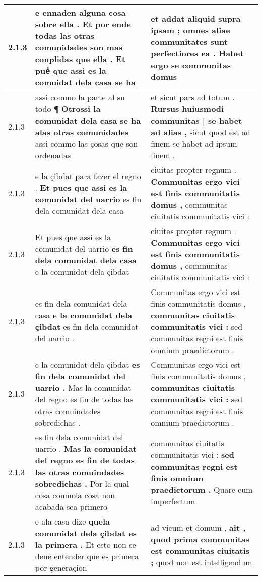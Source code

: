 \begin{tabular}{|p{1cm}|p{6.5cm}|p{6.5cm}|}
2.1.3 & e ennaden alguna cosa sobre ella . \textbf{ Et por ende todas las otras comunidades son mas conplidas que ella . } Et pueᷤ que assi es la comuidat dela casa se ha & et addat aliquid supra ipsam ; \textbf{ omnes aliae communitates sunt perfectiores ea . } Habet ergo se communitas domus \\\hline
2.1.3 & assi commo la parte al su todo ¶ \textbf{ Otrossi la comunidat dela casa se ha alas otras comunidades } assi commo las çosas que son ordenadas & et sicut pars ad totum . \textbf{ Rursus huiusmodi communitas | se habet ad alias , } sicut quod est ad finem se habet ad ipsum finem . \\\hline
2.1.3 & e la çibdat para fazer el regno . \textbf{ Et pues que assi es la comunidat del uarrio } es fin dela comunidat dela casa & ciuitas propter regnum . \textbf{ Communitas ergo vici est finis communitatis domus , } communitas ciuitatis communitatis vici : \\\hline
2.1.3 & Et pues que assi es la comunidat del uarrio \textbf{ es fin dela comunidat dela casa } e la comunidat dela çibdat & ciuitas propter regnum . \textbf{ Communitas ergo vici est finis communitatis domus , } communitas ciuitatis communitatis vici : \\\hline
2.1.3 & es fin dela comunidat dela casa \textbf{ e la comunidat dela çibdat } es fin dela comunidat del uarrio . & Communitas ergo vici est finis communitatis domus , \textbf{ communitas ciuitatis communitatis vici : } sed communitas regni est finis omnium praedictorum . \\\hline
2.1.3 & e la comunidat dela çibdat \textbf{ es fin dela comunidat del uarrio . } Mas la comunidat del regno es fin de todas las otras comuindades sobredichas . & Communitas ergo vici est finis communitatis domus , \textbf{ communitas ciuitatis communitatis vici : } sed communitas regni est finis omnium praedictorum . \\\hline
2.1.3 & es fin dela comunidat del uarrio . \textbf{ Mas la comunidat del regno es fin de todas las otras comuindades sobredichas . } Por la qual cosa conmola cosa non acabada sea primero & communitas ciuitatis communitatis vici : \textbf{ sed communitas regni est finis omnium praedictorum . } Quare cum imperfectum \\\hline
2.1.3 & e ala casa dize \textbf{ quela comunidat dela çibdat es la primera . } Et esto non se deue entender que es primera por generaçion & ad vicum et domum , \textbf{ ait , quod prima communitas est communitas ciuitatis ; } quod non est intelligendum \\\hline

\end{tabular}
